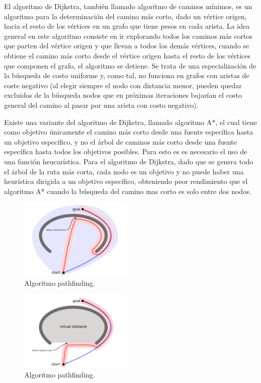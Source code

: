 \documentclass[reprint,amsmath,amssymb,aps]{revtex4-2}
\begin{document}
El algoritmo de Dijkstra, también llamado algoritmo de caminos mínimos, es un algoritmo para la determinación del camino más corto, dado un vértice origen, hacia el resto de los vértices en un grafo que tiene pesos en cada arista. La idea general en este algoritmo consiste en ir explorando todos los caminos más cortos que parten del vértice origen y que llevan a todos los demás vértices, cuando se obtiene el camino más corto desde el vértice origen hasta el resto de los vértices que componen el grafo, el algoritmo se detiene. Se trata de una especialización de la búsqueda de costo uniforme y, como tal, no funciona en grafos con aristas de coste negativo (al elegir siempre el nodo con distancia menor, pueden quedar excluidos de la búsqueda nodos que en próximas iteraciones bajarían el costo general del camino al pasar por una arista con costo negativo).

Existe una variante del algoritmo de Dijkstra, llamado algoritmo A*, el cual tiene como objetivo únicamente el camino más corto desde una fuente específica hasta un objetivo específico, y no el árbol de caminos más corto desde una fuente específica hasta todos los objetivos posibles. Para esto es es necesario el uso de una función heucarística. Para el algoritmo de Dijkstra, dado que se genera todo el árbol de la ruta más corta, cada nodo es un objetivo y no puede haber una heurística dirigida a un objetivo específico, obteniendo peor rendimiento que el algoritmo A* cuando la búsqueda del camino mas corto es solo entre dos nodos.

 \begin{figure}[H]
 	\centering
 	\includegraphics[width=0.48\textwidth]{concave1.png}
 	\caption{Algoritmo pathfinding.}
 	\label{concave1}
 \end{figure}
 
  \begin{figure}[H]
 	\centering
 	\includegraphics[width=0.48\textwidth]{concave2.png}
 	\caption{Algoritmo pathfinding.}
 	\label{concave2}
 \end{figure}
\end{document}
